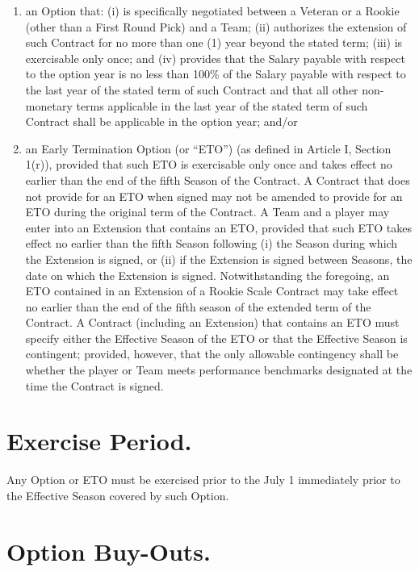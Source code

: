 \documentclass[
]{book}
\providecommand{\tightlist}{%
  \setlength{\itemsep}{0pt}\setlength{\parskip}{0pt}}
\begin{document}
\begin{enumerate}
\def\labelenumi{(\alph{enumi})}
\tightlist
\item
  an Option that: (i) is specifically negotiated between a Veteran or a Rookie (other than a First Round Pick) and a Team; (ii) authorizes the extension of such Contract for no more than one (1) year beyond the stated term; (iii) is exercisable only once; and (iv) provides that the Salary payable with respect to the option year is no less than 100\% of the Salary payable with respect to the last year of the stated term of such Contract and that all other non-monetary terms applicable in the last year of the stated term of such Contract shall be applicable in the option year; and/or
\item
  an Early Termination Option (or ``ETO'') (as defined in Article I, Section 1(r)), provided that such ETO is exercisable only once and takes effect no earlier than the end of the fifth Season of the Contract. A Contract that does not provide for an ETO when signed may not be amended to provide for an ETO during the original term of the Contract. A Team and a player may enter into an Extension that contains an ETO, provided that such ETO takes effect no earlier than the fifth Season following (i) the Season during which the Extension is signed, or (ii) if the Extension is signed between Seasons, the date on which the Extension is signed. Notwithstanding the foregoing, an ETO contained in an Extension of a Rookie Scale Contract may take effect no earlier than the end of the fifth season of the extended term of the Contract. A Contract (including an Extension) that contains an ETO must specify either the Effective Season of the ETO or that the Effective Season is contingent; provided, however, that the only allowable contingency shall be whether the player or Team meets performance benchmarks designated at the time the Contract is signed.
\end{enumerate}

\hypertarget{exercise-period.}{%
\section{Exercise Period.}\label{exercise-period.}}

Any Option or ETO must be exercised prior to the July 1 immediately prior to the Effective Season covered by such Option.

\hypertarget{option-buy-outs.}{%
\section{Option Buy-Outs.}\label{option-buy-outs.}}
\end{document}
